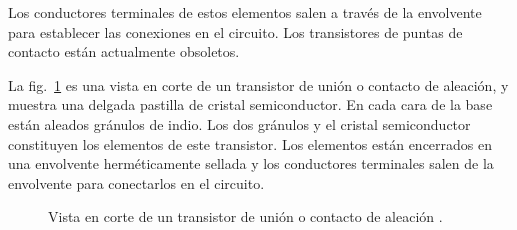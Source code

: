 \documentclass[a4paper,12pt]{article}
\begin{document}
Los conductores terminales de estos elementos salen a través de la envolvente para establecer las conexiones
en el circuito. Los transistores de puntas de contacto están actualmente obsoletos.

La fig.~\ref{fig:11-3} es una vista en corte de un transistor de unión o contacto de aleación, y muestra una
delgada pastilla de cristal semiconductor. En cada cara de la base están aleados gránulos de indio. Los dos
gránulos y el cristal semiconductor constituyen los elementos de este transistor. Los elementos están encerrados
en una envolvente herméticamente sellada y los conductores terminales salen de la envolvente para conectarlos
en el circuito.

\begin{figure}[h]
    \centering
    \caption{Vista en corte de un transistor de unión o contacto de aleación .}
    \label{fig:11-3}
\end{figure}
\end{document}
